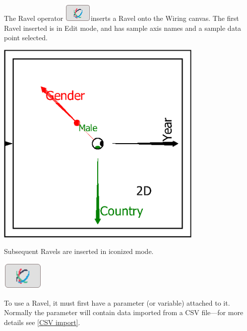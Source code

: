 The Ravel operator \includegraphics{images/RavelWidget}inserts a
Ravel onto the Wiring canvas. The first Ravel inserted is in Edit
mode, and has sample axis names and a sample data point selected.

\includegraphics[width=10cm]{images/RavelBlank}

Subsequent Ravels are inserted in iconized mode.

\includegraphics{images/RavelIcon}

To use a Ravel, it must first have a parameter (or variable) attached
to it. Normally the parameter will contain data imported from a CSV
file---for more details see \ref{CSV import}.

